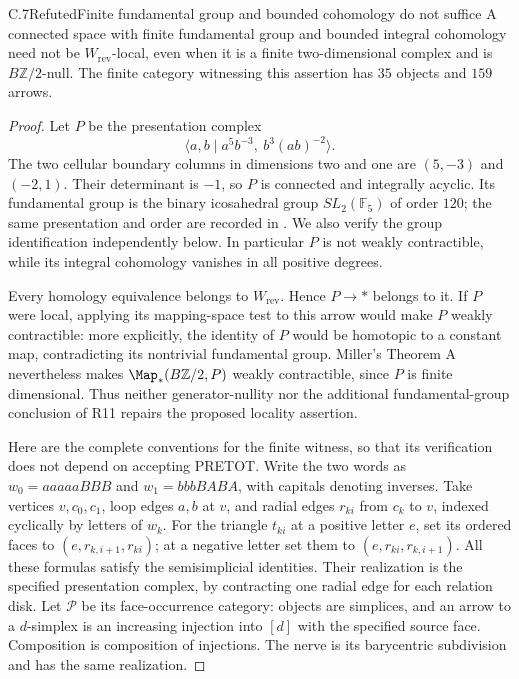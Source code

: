 \begin{claim}{C.7}{Refuted}{Finite fundamental group and bounded cohomology do not suffice}
A connected space with finite fundamental group and bounded integral cohomology need not be $W_{\mathrm{rev}}$-local, even when it is a finite two-dimensional complex and is $B\mathbb Z/2$-null. The finite category witnessing this assertion has $35$ objects and $159$ arrows.
\end{claim}
\begin{proof}
Let $P$ be the presentation complex
\[
 \langle a,b\mid a^5b^{-3},\ b^3(ab)^{-2}\rangle.
\]
The two cellular boundary columns in dimensions two and one are $(5,-3)$ and $(-2,1)$. Their determinant is $-1$, so $P$ is connected and integrally acyclic. Its fundamental group is the binary icosahedral group $SL_2(\mathbb F_5)$ of order $120$; the same presentation and order are recorded in \citet[Example 2.38, p.~142]{FGHHatcher2002}. We also verify the group identification independently below. In particular $P$ is not weakly contractible, while its integral cohomology vanishes in all positive degrees.

Every homology equivalence belongs to $W_{\mathrm{rev}}$. Hence $P\to *$ belongs to it. If $P$ were local, applying its mapping-space test to this arrow would make $P$ weakly contractible: more explicitly, the identity of $P$ would be homotopic to a constant map, contradicting its nontrivial fundamental group. Miller's Theorem A nevertheless makes $\Map_*(B\mathbb Z/2,P)$ weakly contractible, since $P$ is finite dimensional. Thus neither generator-nullity nor the additional fundamental-group conclusion of R11 repairs the proposed locality assertion.

Here are the complete conventions for the finite witness, so that its verification does not depend on accepting PRETOT. Write the two words as $w_0=aaaaaBBB$ and $w_1=bbbBABA$, with capitals denoting inverses. Take vertices $v,c_0,c_1$, loop edges $a,b$ at $v$, and radial edges $r_{ki}$ from $c_k$ to $v$, indexed cyclically by letters of $w_k$. For the triangle $t_{ki}$ at a positive letter $e$, set its ordered faces to $(e,r_{k,i+1},r_{ki})$; at a negative letter set them to $(e,r_{ki},r_{k,i+1})$. All these formulas satisfy the semisimplicial identities. Their realization is the specified presentation complex, by contracting one radial edge for each relation disk. Let $\mathcal P$ be its face-occurrence category: objects are simplices, and an arrow to a $d$-simplex is an increasing injection into $[d]$ with the specified source face. Composition is composition of injections. The nerve is its barycentric subdivision and has the same realization.


\end{proof}
